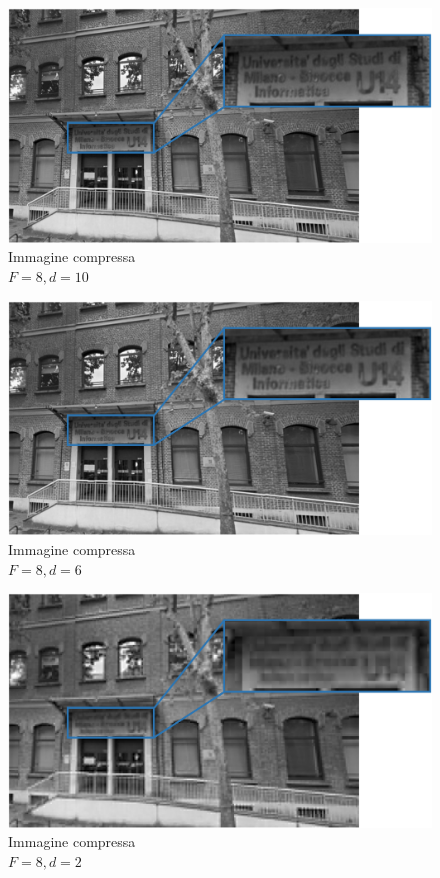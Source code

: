 \documentclass[preprint,12pt]{elsarticle}
\begin{document}
\begin{figure}[H]
	\includegraphics[width=\linewidth]{f2}
	\caption{Immagine compressa\\$F = 8, d = 10$}
	\centering
\end{figure}

\begin{figure}[H]
	\includegraphics[width=\linewidth]{f3}
	\caption{Immagine compressa\\$F = 8, d = 6$}
	\centering
\end{figure}

\begin{figure}[H]
	\includegraphics[width=\linewidth]{f4}
	\caption{Immagine compressa\\$F = 8, d = 2$}
	\centering
\end{figure}
\end{document}

